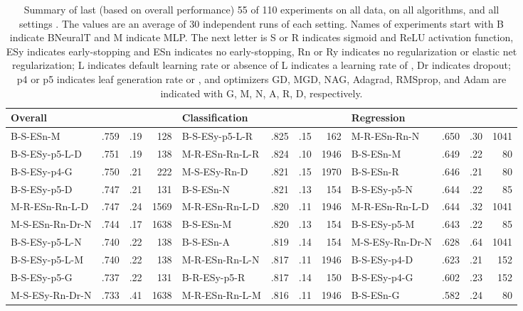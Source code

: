\documentclass[11pt,a4paper]{article}
\begin{document}
\begin{table}[]
    \tiny
    \centering 
    \renewcommand{\arraystretch}{1.2}
    \setlength{\tabcolsep}{5pt}
    \caption{Summary of last (based on overall performance) 55 of 110 experiments on all data, on all algorithms, and all settings . The values are an average of 30 independent runs of each setting. Names of experiments start with B indicate BNeuralT and M indicate MLP. The next letter is S or R indicates sigmoid and ReLU activation function, ESy indicates early-stopping and ESn indicates no early-stopping, Rn or Ry indicates no regularization or elastic net regularization; L indicates default learning rate or absence of L indicates a learning rate of , Dr indicates dropout; p4 or p5 indicates leaf generation rate  or , and optimizers GD, MGD, NAG, Adagrad, RMSprop, and Adam are  indicated with G, M, N, A, R, D, respectively.
\label{tab:All_experiments_B}}
    \begin{tabular}[t]{lrrrlrrrlrrr}
        \toprule
        Overall &  &  &  & Classification &  &  &  & Regression &  &  &  \\
        \midrule
        B-S-ESn-M & .759 & .19 & 128 & B-S-ESy-p5-L-R & .825 & .15 & 162 & M-R-ESn-Rn-N & .650 & .30 & 1041  \\
        B-S-ESy-p5-L-D & .751 & .19 & 138 & M-R-ESn-Rn-L-R & .824 & .10 & 1946 & B-S-ESn-M & .649 & .22 & 80  \\
        B-S-ESy-p4-G & .750 & .21 & 222 & M-S-ESy-Rn-D & .821 & .15 & 1970 & B-S-ESn-R & .646 & .21 & 80  \\
        B-S-ESy-p5-D & .747 & .21 & 131 & B-S-ESn-N & .821 & .13 & 154 & B-S-ESy-p5-N & .644 & .22 & 85  \\
        M-R-ESn-Rn-L-D & .747 & .24 & 1569 & M-R-ESn-Rn-L-D & .820 & .11 & 1946 & M-R-ESn-Rn-L-D & .644 & .32 & 1041  \\
        M-S-ESn-Rn-Dr-N & .744 & .17 & 1638 & B-S-ESn-M & .820 & .13 & 154 & B-S-ESy-p5-M & .643 & .22 & 85  \\
        B-S-ESy-p5-L-N & .740 & .22 & 138 & B-S-ESn-A & .819 & .14 & 154 & M-S-ESy-Rn-Dr-N & .628 & .64 & 1041  \\
        B-S-ESy-p5-L-M & .740 & .22 & 138 & M-R-ESn-Rn-L-N & .817 & .11 & 1946 & B-S-ESy-p4-D & .623 & .21 & 152  \\
        B-S-ESy-p5-G & .737 & .22 & 131 & B-R-ESy-p5-R & .817 & .14 & 150 & B-S-ESy-p4-G & .602 & .23 & 152  \\
        M-S-ESy-Rn-Dr-N & .733 & .41 & 1638 & M-R-ESn-Rn-L-M & .816 & .11 & 1946 & B-S-ESn-G & .582 & .24 & 80  \\

\end{tabular}
\end{table}
\end{document}

